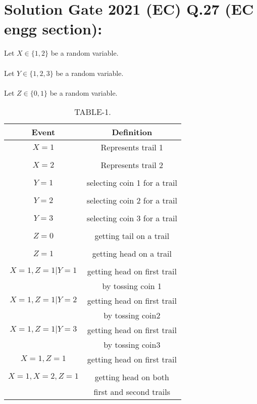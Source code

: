 \documentclass[journal,12pt,twocolumn]{IEEEtran}
\begin{document}
\section*{Solution Gate 2021 (EC) Q.27 (EC engg section):}
Let $X \in \{1,2\}$ be a random variable.\\
\\Let  $Y \in \{1,2,3\}$ be a random variable.\\
\\Let $Z \in \{0,1\}$ be a random variable.\\
\newpage
\begin{table}[h!]
    \resizebox{7cm}{!}
    {
    \begin{tabular}{|c|c|}
    \hline
        Event & Definition \\
         \hline
         $X=1$ & Represents trail 1\\&\\
         \hline
         $X=2$ & Represents trail 2\\&\\
         \hline
         $Y=1$ & selecting coin 1 for a trail\\&\\
         \hline
         $Y=2$ & selecting coin 2 for a trail\\&\\
         \hline
         $Y=3$ & selecting coin 3 for a trail\\&\\
         \hline
         $Z=0$ & getting tail on a trail\\&\\
         \hline
         $Z=1$ & getting head on a trail\\&\\
         \hline 
         $X=1,Z=1|Y=1$ & getting head on first trail
         \\ & by tossing coin 1\\
         \hline
         $X=1,Z=1|Y=2$ & getting head on first trail
         \\ & by tossing coin2 \\
         \hline
         $X=1,Z=1|Y=3$ & getting head on first trail
         \\ & by tossing coin3 \\
         \hline
         $X=1,Z=1$ & getting head on first trail\\&\\
         \hline
         $X=1,X=2,Z=1$ & getting head on both \\ &first and second trails\\
         \hline
    \end{tabular}
    }
    \caption{\label{tab:table-1}TABLE-1.}
\end{table}
\end{document}
